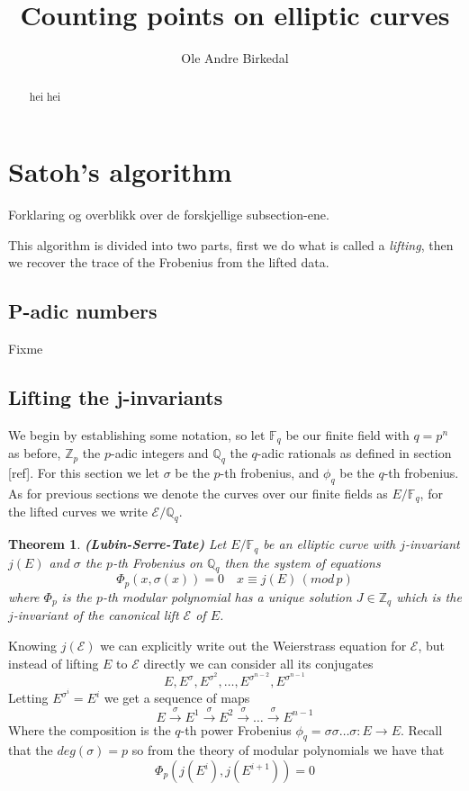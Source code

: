 \documentclass[a4paper,10pt]{amsart}
\title{Counting points on elliptic curves}
\author{Ole Andre Birkedal}
\begin{document}
\newtheorem{thm}{Theorem}
\newtheorem{mydef}{Definition}
\newtheorem{ex}{Example}
\newtheorem{prop}{Proposition}
\newtheorem{lemma}{Lemma}

\begin{abstract}
hei hei
\end{abstract}

\maketitle
\tableofcontents







\section{Satoh's algorithm}
Forklaring og overblikk over de forskjellige subsection-ene.

This algorithm is divided into two parts, first we do what is called a \emph{lifting}, then
we recover the trace of the Frobenius from the lifted data.
\subsection{P-adic numbers}
Fixme
\subsection{Lifting the j-invariants}
We begin by establishing some notation, so let $\mathbb{F}_q$ be our finite field with $q=p^n$ as before,
$\mathbb{Z}_p$ the $p$-adic integers and $\mathbb{Q}_q$ the $q$-adic rationals as defined in section [ref].
For this section we let $\sigma$ be the $p$-th frobenius, and $\phi_q$ be the $q$-th frobenius.
As for previous sections we denote the curves over our finite fields as $E/\mathbb{F}_q$,
for the lifted curves we write $\mathscr{E}/\mathbb{Q}_q$.

\begin{thm}
 \textbf{(Lubin-Serre-Tate)} Let $E/\mathbb{F}_q$ be an elliptic curve with $j$-invariant $j(E)$ and
$\sigma$ the $p$-th Frobenius on $\mathbb{Q}_q$ then the system of equations
$$ \Phi_p(x, \sigma(x)) = 0 \quad x \equiv j(E) \, (mod\, p)$$
where $\Phi_p$ is the $p$-th modular polynomial has a unique solution $J \in \mathbb{Z}_q$ 
which is the $j$-invariant of the canonical lift $\mathscr{E}$ of $E$.
\end{thm}

Knowing $j(\mathscr{E})$ we can explicitly write out the Weierstrass equation for $\mathscr{E}$, but
instead of lifting $E$ to $\mathscr{E}$ directly we can consider all its conjugates
$$E, E^\sigma, E^{\sigma^2}, \ldots, E^{\sigma^{n-2}}, E^{\sigma^{n-1}} $$
Letting $E^{\sigma^i} = E^i $ we get a sequence of maps
$$ E \overset{\sigma}{\rightarrow} E^1 \overset{\sigma}{\rightarrow} E^2 \overset{\sigma}{\rightarrow}
\ldots \overset{\sigma}{\rightarrow} E^{n-1} $$
Where the composition is the $q$-th power Frobenius $\phi_q = \sigma \sigma \ldots \sigma: E \rightarrow E$.
Recall that the $deg(\sigma) = p$ so from the theory of modular polynomials we have that
$$ \Phi_p(j(E^i), j(E^{i+1})) = 0 $$
\end{document}
